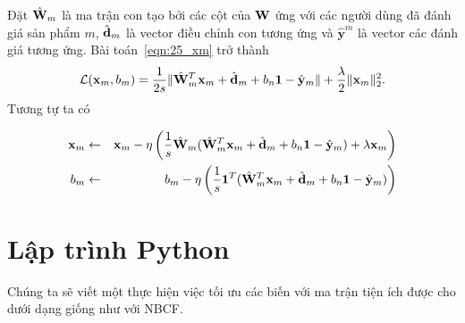 Đặt $\hat{\mathbf{W}}_m$ là ma trận con tạo bởi các cột của $\mathbf{W}$ ứng
với các người dùng đã đánh giá sản phẩm $m$, $\hat{\mathbf{d}}_m$ là vector điều chỉnh con
tương ứng và $\hat{\mathbf{y}}^m$ là vector các đánh giá tương ứng. Bài
toán~\eqref{eqn:25_xm} trở thành
\begin{equation}
\mathcal{L}(\mathbf{x}_m, b_m)
= \frac{1}{2s}\|\hat{\mathbf{W}}_m^T\mathbf{x}_m + \hat{\mathbf{d}}_m + b_n\mathbf{1} - \hat{\mathbf{y}}_m \| +
\frac{\lambda}{2}\|\mathbf{x}_m\|_2^2.
\end{equation}
Tương tự ta có

\begin{eqnarray}
\mathbf{x}_m &\leftarrow & \mathbf{x}_m -
\eta\left(\frac{1}{s}\hat{\mathbf{W}}_m(\hat{\mathbf{W}}_m^T\mathbf{x}_m + \hat{\mathbf{d}}_m +
b_n\mathbf{1} - \hat{\mathbf{y}}_m) + \lambda\mathbf{x}_m\right) \\
b_m &\leftarrow& b_m - \eta\left(\frac{1}{s}\mathbf{1}^T(\hat{\mathbf{W}}_m^T\mathbf{x}_m + \hat{\mathbf{d}}_m +
b_n\mathbf{1} - \hat{\mathbf{y}}_m)\right)
\end{eqnarray}

\section{Lập trình Python }
Chúng ta sẽ viết một  thực hiện việc tối ưu
các biến với ma trận tiện ích được cho dưới dạng  giống
như với NBCF.

